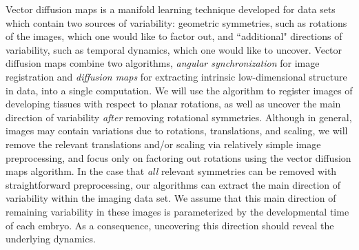 \documentclass[twocolumn, 10pt]{article}
\begin{document}
Vector diffusion maps \citep{singer2012vector} is a manifold learning
technique developed for data sets which contain two sources of variability:
geometric symmetries, such as rotations of the images, which one would like to factor out,
and ``additional" directions of variability, such as temporal dynamics, which one would like to uncover.
%
Vector diffusion maps combine two algorithms, {\em angular synchronization} \citep{singer2011angular} for image registration and {\em diffusion maps} \citep{coifman2005geometric} for extracting intrinsic low-dimensional structure in data, into a single computation.
%
We will use the algorithm to register images of developing tissues with respect to planar rotations, as well as uncover the main direction of variability {\it after} removing rotational symmetries.
%
Although in general, images may contain variations due to rotations, translations, and scaling, we will remove the relevant translations and/or scaling via relatively simple image preprocessing, and focus only on factoring out rotations using the vector diffusion maps algorithm.
%
In the case that {\em all} relevant symmetries can be removed with straightforward preprocessing, our algorithms can extract the main direction of variability within the imaging data set.
%
We assume that this main direction of remaining variability in these images is parameterized by the developmental time of each embryo.
%
As a consequence, uncovering this direction should reveal the underlying dynamics.
\end{document}
